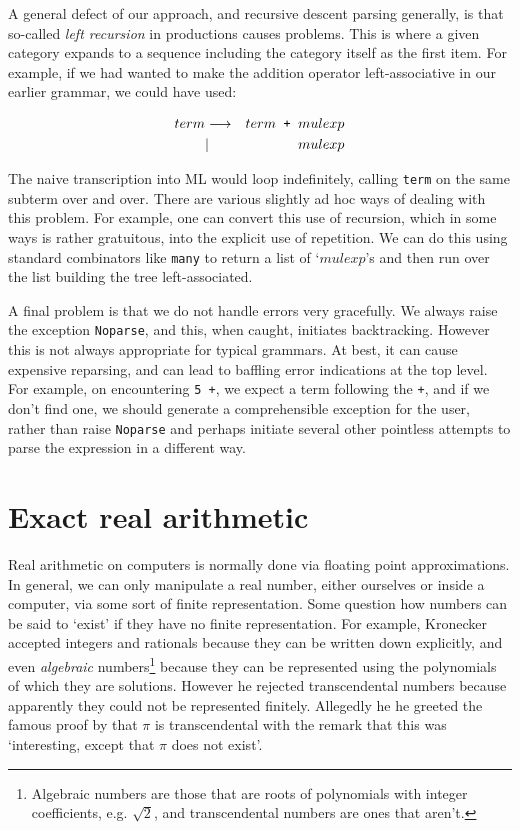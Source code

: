 A general defect of our approach, and recursive descent parsing generally, is
that so-called {\em left recursion} in productions causes problems. This is
where a given category expands to a sequence including the category itself as
the first item. For example, if we had wanted to make the addition operator
left-associative in our earlier grammar, we could have used:

\begin{eqnarray*}
term     & \goesto & term {\verb! + !} mulexp                   \\
         & |       & mulexp
\end{eqnarray*}

The naive transcription into ML would loop indefinitely, calling {\tt term} on
the same subterm over and over. There are various slightly ad hoc ways of
dealing with this problem. For example, one can convert this use of recursion,
which in some ways is rather gratuitous, into the explicit use of repetition.
We can do this using standard combinators like {\tt many} to return a list of
`$mulexp$'s and then run over the list building the tree left-associated.

A final problem is that we do not handle errors very gracefully. We always
raise the exception {\tt Noparse}, and this, when caught, initiates
backtracking. However this is not always appropriate for typical grammars. At
best, it can cause expensive reparsing, and can lead to baffling error
indications at the top level. For example, on encountering {\tt 5 +}, we expect
a term following the {\tt +}, and if we don't find one, we should generate a
comprehensible exception for the user, rather than raise {\tt Noparse} and
perhaps initiate several other pointless attempts to parse the expression in a
different way.

\section{Exact real arithmetic}

Real arithmetic on computers is normally done via floating point
approximations. In general, we can only manipulate a real number, either
ourselves or inside a computer, via some sort of finite representation. Some
question how numbers can be said to `exist' if they have no finite
representation. For example, Kronecker accepted integers and rationals because
they can be written down explicitly, and even {\em algebraic}
numbers\footnote{Algebraic numbers are those that are roots of polynomials with
integer coefficients, e.g. $\sqrt{2}$, and transcendental numbers are ones that
aren't.} because they can be represented using the polynomials of which they
are solutions. However he rejected transcendental numbers because apparently
they could not be represented finitely. Allegedly he he greeted the famous
proof by  that $\pi$ is transcendental with the remark that
this was `interesting, except that $\pi$ does not exist'.

